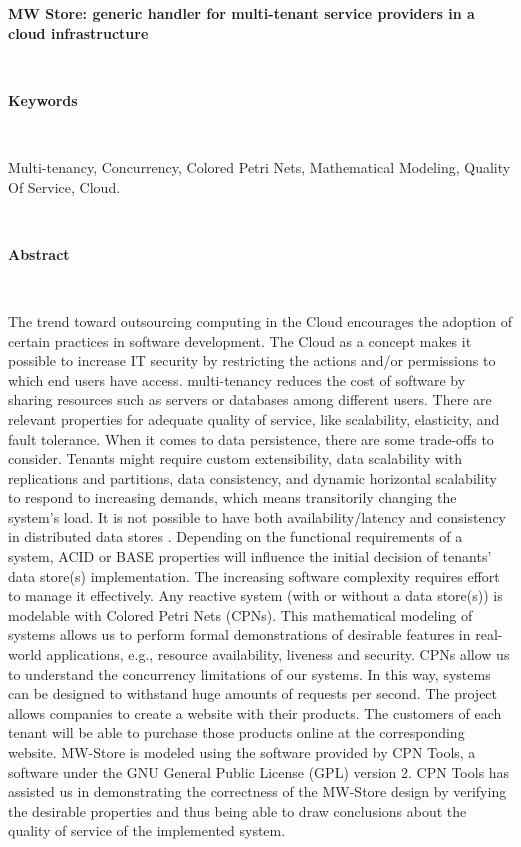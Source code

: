 \documentclass[12pt,english]{article} %
\begin{document}
\textbf{MW Store: generic handler for multi-tenant service providers in a cloud infrastructure}

\

\textbf{Keywords}

\

Multi-tenancy, Concurrency, Colored Petri Nets, Mathematical Modeling, Quality Of Service, Cloud.

\

\textbf{Abstract}

\

The trend toward outsourcing computing in the Cloud encourages the adoption of certain practices in software development.
The Cloud as a concept makes it possible to increase IT security by restricting the actions and/or permissions to which end users have access.
multi-tenancy reduces the cost of software by sharing resources such as servers or databases among different users.
There are relevant properties for adequate quality of service, like scalability, elasticity, and fault tolerance.
When it comes to data persistence, there are some trade-offs to consider.
Tenants might require custom extensibility, data scalability with replications and partitions, data consistency, and dynamic horizontal scalability to respond to increasing demands, which means transitorily changing the system’s load.
It is not possible to have both availability/latency and consistency in distributed data stores \cite{acid-base-database-transaction-processing}.
Depending on the functional requirements of a system, ACID or BASE properties will influence the initial decision of tenants' data store(s) implementation.
The increasing software complexity requires effort to manage it effectively.
Any reactive system (with or without a data store(s)) is modelable with Colored Petri Nets (CPNs).
This mathematical modeling of systems allows us to perform formal demonstrations of desirable features in real-world applications, e.g., resource availability, liveness and security.
CPNs allow us to understand the concurrency limitations of our systems.
In this way, systems can be designed to withstand huge amounts of requests per second.
The project allows companies to create a website with their products.
The customers of each tenant will be able to purchase those products online at the corresponding website.
MW-Store is modeled using the software provided by CPN Tools, a software under the GNU General Public License (GPL) version 2.
CPN Tools has assisted us in demonstrating the correctness of the MW-Store design by verifying the desirable properties and thus being able to draw conclusions about the quality of service of the implemented system.
\end{document}

